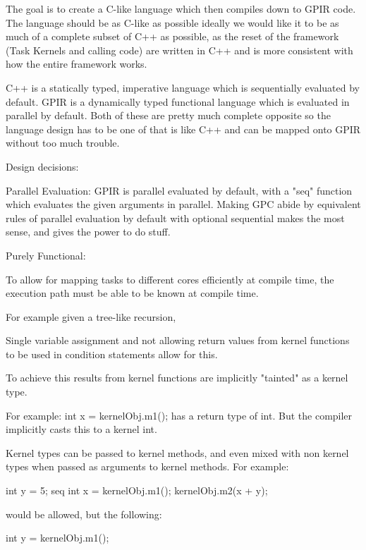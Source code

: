 The goal is to create a C-like language which then compiles down to GPIR code.
The language should be as C-like as possible ideally we would like it to be as much
of a complete subset of C++ as possible, as the reset of the framework (Task Kernels and calling code)
are written in C++ and is more consistent with how the entire framework works.

C++ is a statically typed, imperative language which is sequentially evaluated by default.
GPIR is a dynamically typed functional language which is evaluated in parallel by default.
Both of these are pretty much complete opposite so the language design has to be one of that
is like C++ and can be mapped onto GPIR without too much trouble.

Design decisions:

    Parallel Evaluation:
        GPIR is parallel evaluated by default, with a "seq" function which
        evaluates the given arguments in parallel. Making GPC abide by equivalent rules of parallel
        evaluation by default with optional sequential makes the most sense, and gives the
        power to do stuff. 

    Purely Functional:
        
        To allow for mapping tasks to different cores efficiently
        at compile time, the execution path must be able
        to be known at compile time. 
        
        For example given a tree-like
        recursion, 
        
        Single variable assignment
        and not allowing return values from kernel functions
        to be used in condition statements allow for this.

        To achieve this results from kernel functions are implicitly
        "tainted" as a kernel type.

        For example:
            int x = kernelObj.m1();
        has a return type of int.
        But the compiler implicitly casts this to a 
        kernel int.

        Kernel types can be passed to kernel methods, and even
        mixed with non kernel types when passed as arguments to
        kernel methods. For example:

        int y = 5;
        seq {
            int x = kernelObj.m1();
            kernelObj.m2(x + y);
        }

        would be allowed, but the following:

        int y = kernelObj.m1();



